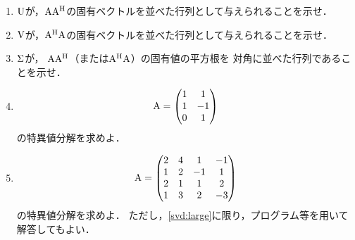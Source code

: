   \begin{enumerate}[label=(\roman*)]
    \item $\mathrm{U}$が，$\mathrm{A}\mathrm{A}^\mathrm{H}$の固有ベクトルを並べた行列として与えられることを示せ．
    \item $\mathrm{V}$が，$\mathrm{A}^\mathrm{H}\mathrm{A}$の固有ベクトルを並べた行列として与えられることを示せ．
    \item $\mathrm{\Sigma}$が，
      $\mathrm{A}\mathrm{A}^\mathrm{H}$（または$\mathrm{A}^\mathrm{H}\mathrm{A}$）の固有値の平方根を
      対角に並べた行列であることを示せ．
    \item
      \begin{equation}
        \mathrm{A} =
          \begin{pmatrix}
            1 & 1 \\
            1 & -1 \\
            0 & 1
          \end{pmatrix}
      \end{equation}
      の特異値分解を求めよ．
    \item \label{svd:large}
      \begin{equation}
        \mathrm{A} =
          \begin{pmatrix}
            2 & 4 & 1 &-1 \\
            1 & 2 & -1 & 1 \\
            2 & 1 & 1 & 2 \\
            1 & 3 & 2 & -3
          \end{pmatrix}
      \end{equation}の特異値分解を求めよ．
      ただし，\ref{svd:large}に限り，プログラム等を用いて解答してもよい．
  \end{enumerate}

\clearpage
